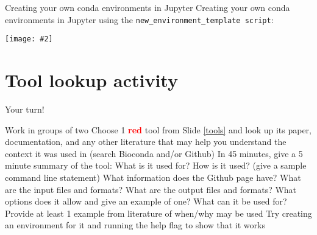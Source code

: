 \documentclass{beamer}
\renewcommand{\c}[1]{\begin{center}#1\end{center}}
\newcommand{\red}[1]{\textcolor{red}{\textbf{#1}}}
\newcommand{\gr}[2][.95]{\c{\texttt{[image: \#2]}}}
\begin{document}
\begin{frame}{Creating your own conda environments in Jupyter}
    Creating your own conda environments in Jupyter using the \texttt{new\_environment\_template\ script}:
    \gr{l7_figs/s30_jupyter.png}
\end{frame}

\section{Tool lookup activity}

\begin{frame}{Your turn!}
    \begin{outline}
        \1 Work in groups of two
        \1 Choose 1 \red{red} tool from Slide \ref{tools} and look up its paper, documentation, and any other literature that may help you understand the context it was used in (search Bioconda and/or Github)
        \1 In 45 minutes, give a 5 minute summary of the tool:
            \2 What is it used for?
            \2 How is it used? (give a sample command line statement)
            \2 What information does the Github page have?
            \2 What are the input files and formats?
            \2 What are the output files and formats?
            \2 What options does it allow and give an example of one?
            \2 What can it be used for? Provide at least 1 example from literature of when/why may be used
            \2 Try creating an environment for it and running the help flag to show that it works
    \end{outline}
\end{frame}
\end{document}
